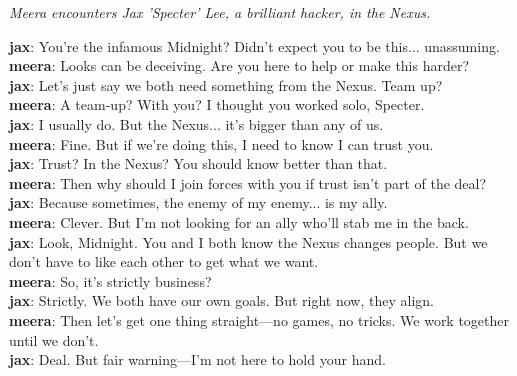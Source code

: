 \documentclass[12pt]{book}
\begin{document}
\newpage

\textit{Meera encounters Jax 'Specter' Lee, a brilliant hacker, in the Nexus.}

\textbf{jax}: You're the infamous Midnight? Didn't expect you to be this... unassuming.\\

\textbf{meera}: Looks can be deceiving. Are you here to help or make this harder?\\

\textbf{jax}: Let's just say we both need something from the Nexus. Team up?\\

\textbf{meera}: A team-up? With you? I thought you worked solo, Specter.\\

\textbf{jax}: I usually do. But the Nexus... it's bigger than any of us.\\

\textbf{meera}: Fine. But if we're doing this, I need to know I can trust you.\\

\textbf{jax}: Trust? In the Nexus? You should know better than that.\\

\textbf{meera}: Then why should I join forces with you if trust isn't part of the deal?\\

\textbf{jax}: Because sometimes, the enemy of my enemy... is my ally.\\

\textbf{meera}: Clever. But I'm not looking for an ally who'll stab me in the back.\\

\textbf{jax}: Look, Midnight. You and I both know the Nexus changes people. But we don't have to like each other to get what we want.\\

\textbf{meera}: So, it's strictly business?\\

\textbf{jax}: Strictly. We both have our own goals. But right now, they align.\\

\textbf{meera}: Then let's get one thing straight—no games, no tricks. We work together until we don't.\\

\textbf{jax}: Deal. But fair warning—I'm not here to hold your hand.\\
\end{document}
